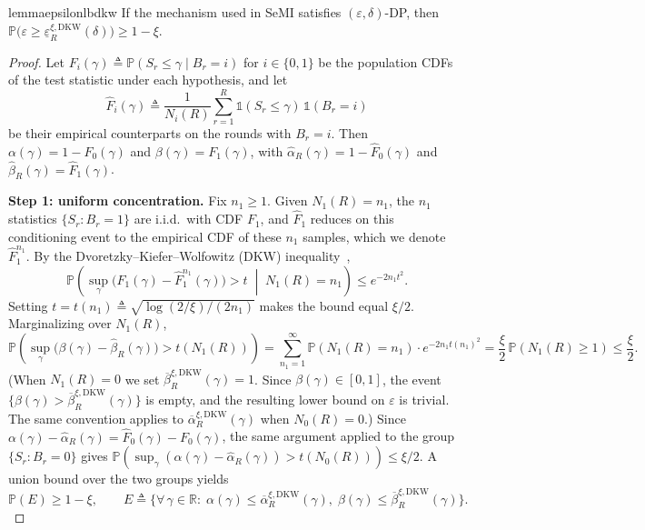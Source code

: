\documentclass{article}
\theoremstyle{plain}
\theoremstyle{definition}
\theoremstyle{remark}
\newcommand{\RR}{\ensuremath{\mathbb{R}}}
\renewcommand{\leq}{\leqslant}
\renewcommand{\geq}{\geqslant}
\newcommand{\bP}{\mathbb{P}}
\begin{document}
\begin{restatable}{lemma}{epsilonlbdkw}\label{lem:epsilonlb-dkw}
    If the mechanism used in SeMI satisfies $(\varepsilon,\delta)$-DP, then $\bP\bigl(\varepsilon \geq \underline{\varepsilon}_{R}^{\xi,\mathrm{DKW}}(\delta)\bigr) \geq 1 - \xi$.
\end{restatable}

\begin{proof}
    Let $F_i(\gamma) \triangleq \bP(S_r \leq \gamma \mid B_r = i)$ for $i \in \{0,1\}$ be the population CDFs of the test statistic under each hypothesis, and let
    \begin{equation*}
        \hat F_i(\gamma) \triangleq \frac{1}{N_i(R)}\sum_{r=1}^{R} \mathds{1}(S_r \leq \gamma)\,\mathds{1}(B_r = i)
    \end{equation*}
    be their empirical counterparts on the rounds with $B_r = i$. Then $\alpha(\gamma) = 1 - F_0(\gamma)$ and $\beta(\gamma) = F_1(\gamma)$, with $\widehat\alpha_R(\gamma) = 1 - \hat F_0(\gamma)$ and $\widehat\beta_R(\gamma) = \hat F_1(\gamma)$.

    \textbf{Step 1: uniform concentration.}
    Fix $n_1 \geq 1$. Given $N_1(R) = n_1$, the $n_1$ statistics $\{S_r : B_r = 1\}$ are i.i.d.\ with CDF $F_1$, and $\hat F_1$ reduces on this conditioning event to the empirical CDF of these $n_1$ samples, which we denote $\hat F_1^{n_1}$. By the Dvoretzky--Kiefer--Wolfowitz (DKW) inequality~\citep{massart1990},
    \[
        \bP\!\left(\sup_{\gamma}\bigl(F_1(\gamma) - \hat{F}_1^{n_1}(\gamma)\bigr) > t \;\middle|\; N_1(R) = n_1\right) \leq e^{-2n_1 t^2}.
    \]
    Setting $t = t(n_1) \triangleq \sqrt{\log(2/\xi)/(2n_1)}$ makes the bound equal $\xi/2$. Marginalizing over $N_1(R)$,
    \[
        \bP\!\left(\sup_\gamma\bigl(\beta(\gamma) - \widehat{\beta}_R(\gamma)\bigr) > t(N_1(R))\right)
        = \sum_{n_1=1}^{\infty} \bP(N_1(R) = n_1)\cdot e^{-2n_1 t(n_1)^2}
        = \frac{\xi}{2}\,\bP(N_1(R) \geq 1) \leq \frac{\xi}{2}.
    \]
    (When $N_1(R) = 0$ we set $\overline{\beta}_R^{\xi,\mathrm{DKW}}(\gamma) = 1$. Since $\beta(\gamma) \in [0,1]$, the event $\{\beta(\gamma) > \overline{\beta}_R^{\xi,\mathrm{DKW}}(\gamma)\}$ is empty, and the resulting lower bound on $\varepsilon$ is trivial. The same convention applies to $\overline{\alpha}_R^{\xi,\mathrm{DKW}}(\gamma)$ when $N_0(R) = 0$.)
    Since $\alpha(\gamma) - \widehat{\alpha}_R(\gamma) = \hat{F}_0(\gamma) - F_0(\gamma)$, the same argument applied to the group $\{S_r : B_r = 0\}$ gives $\bP(\sup_\gamma(\alpha(\gamma) - \widehat{\alpha}_R(\gamma)) > t(N_0(R))) \leq \xi/2$. A union bound over the two groups yields
    \[
        \bP(E) \geq 1 - \xi, \qquad
        E \triangleq \bigl\{\forall\,\gamma \in \RR:\; \alpha(\gamma) \leq \overline{\alpha}_R^{\xi,\mathrm{DKW}}(\gamma),\; \beta(\gamma) \leq \overline{\beta}_R^{\xi,\mathrm{DKW}}(\gamma)\bigr\}.
    \]


\end{proof}
\end{document}
